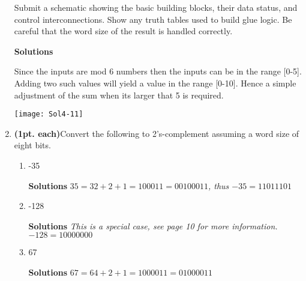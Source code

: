 \begin{enumerate}
                Submit a schematic showing the basic building blocks, their
                data status, and control interconnections.  Show any truth
                tables used to build glue logic.  Be careful that the word
                size of the result is handled correctly.

                \begin{onlysolution} \textbf{Solutions} \itshape{
                        Since the inputs are mod 6 numbers then the inputs can be in the
                        range [0-5].  Adding two such values will yield a value in the
                        range [0-10].  Hence a simple adjustment of the sum when its larger
                        that 5 is required.

                        \texttt{[image: Sol4-11]}

                    }
                \end{onlysolution}

            \item \textbf{ (1pt. each)}Convert the following to 2's-complement
                assuming a word size of eight bits.
                \begin{enumerate}
                    \item -35

                        \begin{onlysolution} \textbf{Solutions} \itshape{
                                $35 = 32+2+1 = 100011 = 00100011$, thus $-35=11011101$
                            }
                        \end{onlysolution}

                    \item  -128

                        \begin{onlysolution} \textbf{Solutions} \itshape{
                                This is a special case, see page 10 for more information.
                                $-128 = 10000000$
                            }
                        \end{onlysolution}

                    \item  67

                        \begin{onlysolution} \textbf{Solutions} \itshape{
                                $67=64+2+1 = 100 0011 = 0100 0011$
                            }
                        \end{onlysolution}


\end{enumerate}
\end{enumerate}
